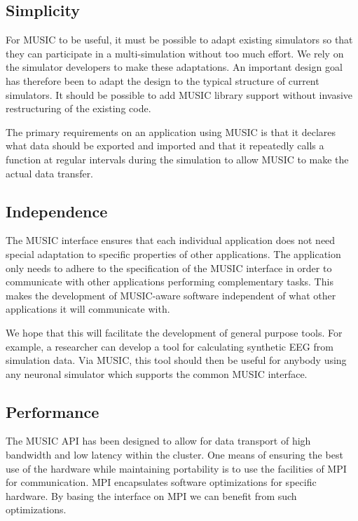 \documentclass[a4paper,twoside]{report}
\begin{document}
\subsection{Simplicity}
\label{sec:simplicity}

For MUSIC to be useful, it must be possible to adapt existing
simulators so that they can participate in a multi-simulation without
too much effort.  We rely on the simulator developers to make these
adaptations.  An important design goal has therefore been to adapt the
design to the typical structure of current simulators.  It should be
possible to add MUSIC library support without invasive restructuring
of the existing code.

The primary requirements on an application using MUSIC is that it
declares what data should be exported and imported and that it
repeatedly calls a function at regular intervals during the simulation
to allow MUSIC to make the actual data transfer.


\subsection{Independence}

The MUSIC interface ensures that each individual application does not
need special adaptation to specific properties of other applications.
The application only needs to adhere to the specification of the MUSIC
interface in order to communicate with other applications performing
complementary tasks.  This makes the development of MUSIC-aware
software independent of what other applications it will communicate
with.

We hope that this will facilitate the development of general purpose
tools.  For example, a researcher can develop a tool for calculating
synthetic EEG from simulation data.  Via MUSIC, this tool should then
be useful for anybody using any neuronal simulator which supports the
common MUSIC interface.


\subsection{Performance}

The MUSIC API has been designed to allow for data transport of high
bandwidth and low latency within the cluster.  One means of ensuring
the best use of the hardware while maintaining portability is to use
the facilities of MPI for communication.  MPI encapsulates software
optimizations for specific hardware. By basing the interface on MPI we
can benefit from such optimizations.
\end{document}
